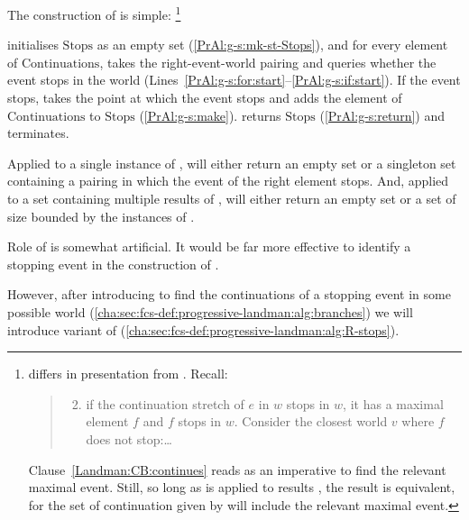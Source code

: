 \begin{note}
  The construction of \AlgGetStops{} is simple:%
  \footnote{
    \AlgGetStops{} differs in presentation from \citeauthor{Landman:1992wh}.
    Recall:
    \begin{quote}
      \begin{enumerate}
        \setcounter{enumi}{1}
      \item
        if the continuation stretch of \(e\) in \(w\) stops in \(w\), it has a maximal element \(f\) and \(f\) stops in \(w\).
        Consider the closest world \(v\) where \(f\) does not stop:\dots
      \end{enumerate}
    \end{quote}
    Clause~\ref{Landman:CB:continues} reads as an imperative to find the relevant maximal event.
    Still, so long as \AlgGetStops{} is applied to results \AlgAC{}, the result is equivalent, for the set of continuation given by \AlgAC{} will include the relevant maximal event.
  }

  \AlgGetStops{} initialises \(\text{Stops}\) as an empty set (\autoref{PrAl:g-s:mk-st-Stops}), and for every element of \(\text{Continuations}\), \AlgGetStops{} takes the right-event-world pairing and queries whether the event stops in the world (Lines~\ref{PrAl:g-s:for:start}--\ref{PrAl:g-s:if:start}).
  If the event stops, \AlgGetStops{} takes the point at which the event stops and adds the element of \(\text{Continuations}\)%
  to \(\text{Stops}\) (\autoref{PrAl:g-s:make}).
  \AlgGetStops{} returns \(\text{Stops}\) (\autoref{PrAl:g-s:return}) and terminates.
\end{note}

\begin{note}
  Applied to a single instance of \AlgAC{}, \AlgGetStops{} will either return an empty set or a singleton set containing a pairing in which the event of the right element stops.
  And, applied to a set containing multiple results of \AlgAC{}, \AlgGetStops{} will either return an empty set or a set of size bounded by the instances of \AlgAC{}.
\end{note}

\begin{note}
  Role of \AlgGetStops{} is somewhat artificial.
  It would be far more effective to identify a stopping event in the construction of \AlgAC{}.

  However, after introducing \AlgFindBranches{} to find the continuations of a stopping event in some possible world (\autoref{cha:sec:fcs-def:progressive-landman:alg:branches}) we will introduce variant of \AlgGetStops{} (\autoref{cha:sec:fcs-def:progressive-landman:alg:R-stops}).
\end{note}

